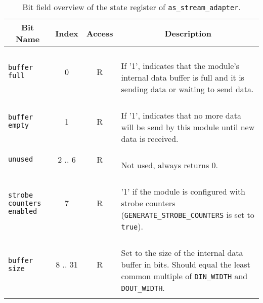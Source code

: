 \begin{longtable}[ht]{|l|c|c|l|}
    \hline
    \multicolumn{1}{|c|}{\textbf{Bit Name}} & \multicolumn{1}{c|}{\textbf{Index}} & \multicolumn{1}{c|}{\textbf{Access}} & \multicolumn{1}{c|}{\textbf{Description}}\\
    \hline
    
    \texttt{buffer full} & 0 & R & \parbox{8.5cm}{\ \\
        If '1', indicates that the module's internal data buffer is full and it is sending data or waiting to send data.\vspace{0.3em}
    }\\
    \hline
    
    \texttt{buffer empty} & 1 & R & \parbox{8.5cm}{\ \\
        If '1', indicates that no more data will be send by this module until new data is received.\vspace{0.3em}
    }\\
    \hline
    
    \texttt{unused} & 2 .. 6 & R & \parbox{8.5cm}{\ \\
        Not used, always returns 0.\vspace{0.3em}
    }\\
    \hline
    
    \parbox{3.5cm}{ \texttt{strobe counters enabled}} & 7 & R & \parbox{8.5cm}{\ \\
        '1' if the module is configured with strobe counters (\texttt{GENERATE\_STROBE\_COUNTERS} is set to \texttt{true}).\vspace{0.3em}
    }\\
    \hline
    
    \texttt{buffer size} & 8 .. 31 & R & \parbox{8.5cm}{\ \\
        Set to the size of the internal data buffer in bits. Should equal the least common multiple of \texttt{DIN\_WIDTH} and \texttt{DOUT\_WIDTH}.\vspace{0.3em}
    }\\
    \hline
    
    \caption{Bit field overview of the state register of \texttt{as\_stream\_adapter}.}
\end{longtable}


